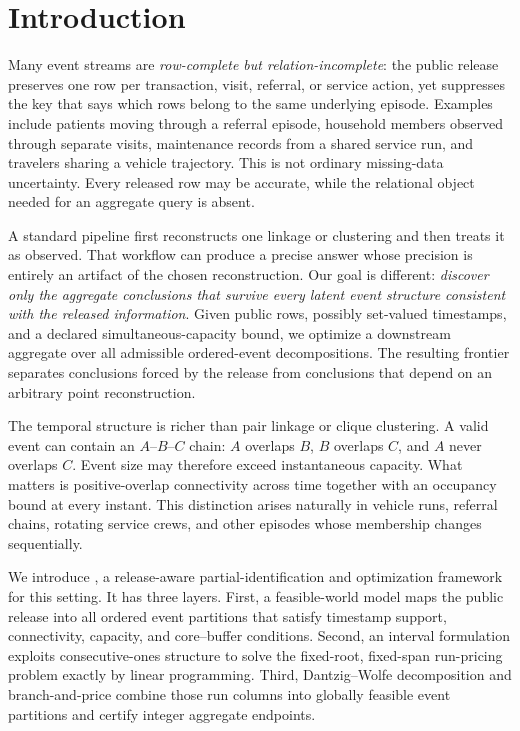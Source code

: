 \section{Introduction}
\label{sec:introduction}

Many event streams are \emph{row-complete but relation-incomplete}: the public
release preserves one row per transaction, visit, referral, or service action,
yet suppresses the key that says which rows belong to the same underlying
episode.  Examples include patients moving through a referral episode,
household members observed through separate visits, maintenance records from a
shared service run, and travelers sharing a vehicle trajectory.  This is not
ordinary missing-data uncertainty.  Every released row may be accurate, while
the relational object needed for an aggregate query is absent.

A standard pipeline first reconstructs one linkage or clustering and then treats
it as observed.  That workflow can produce a precise answer whose precision is
entirely an artifact of the chosen reconstruction.  Our goal is different:
\emph{discover only the aggregate conclusions that survive every latent event
structure consistent with the released information}.  Given public rows,
possibly set-valued timestamps, and a declared simultaneous-capacity bound, we
optimize a downstream aggregate over all admissible ordered-event
decompositions.  The resulting frontier separates conclusions forced by the
release from conclusions that depend on an arbitrary point reconstruction.

The temporal structure is richer than pair linkage or clique clustering.  A
valid event can contain an $A$--$B$--$C$ chain: $A$ overlaps $B$, $B$ overlaps
$C$, and $A$ never overlaps $C$.  Event size may therefore exceed instantaneous
capacity.  What matters is positive-overlap connectivity across time together
with an occupancy bound at every instant.  This distinction arises naturally
in vehicle runs, referral chains, rotating service crews, and other episodes
whose membership changes sequentially.

We introduce \methodname, a release-aware partial-identification and
optimization framework for this setting.  It has three layers.  First, a
feasible-world model maps the public release into all ordered event partitions
that satisfy timestamp support, connectivity, capacity, and core--buffer
conditions.  Second, an interval formulation exploits consecutive-ones
structure to solve the fixed-root, fixed-span run-pricing problem exactly by
linear programming.  Third, Dantzig--Wolfe decomposition and branch-and-price
combine those run columns into globally feasible event partitions and certify
integer aggregate endpoints.


